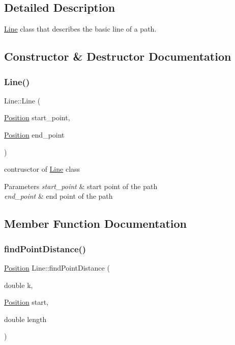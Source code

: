 \subsection{Detailed Description}
\mbox{\hyperlink{class_line}{Line}} class that describes the basic line of a path. 

\subsection{Constructor \& Destructor Documentation}
\mbox{\label{class_line_a123e1da8ef560bac5ab6b643e25c3d8f}} 
\subsubsection{\texorpdfstring{Line()}{Line()}}
{\footnotesize\ttfamily Line\+::\+Line (\begin{DoxyParamCaption}\item[{\mbox{\hyperlink{class_position}{Position}}}]{start\+\_\+point,  }\item[{\mbox{\hyperlink{class_position}{Position}}}]{end\+\_\+point }\end{DoxyParamCaption})}



contrusctor of \mbox{\hyperlink{class_line}{Line}} class 


\begin{DoxyParams}{Parameters}
{\em start\+\_\+point} & start point of the path \\
\hline
{\em end\+\_\+point} & end point of the path \\
\hline
\end{DoxyParams}


\subsection{Member Function Documentation}
\mbox{\label{class_line_a983c7c0071d48eb33644f9da8bc0050b}} 
\subsubsection{\texorpdfstring{find\+Point\+Distance()}{findPointDistance()}}
{\footnotesize\ttfamily \mbox{\hyperlink{class_position}{Position}} Line\+::find\+Point\+Distance (\begin{DoxyParamCaption}\item[{double}]{k,  }\item[{\mbox{\hyperlink{class_position}{Position}}}]{start,  }\item[{double}]{length }\end{DoxyParamCaption})}



